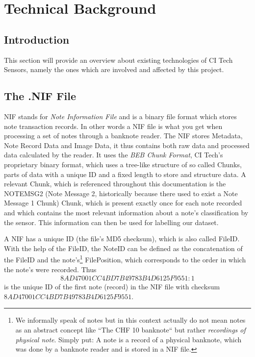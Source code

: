 \chapter{Technical Background}
\label{chap:technicalbackground}

\section{Introduction}
This section will provide an overview about existing technologies of CI Tech Sensors, namely the ones which are involved and affected by this project.

\section{The .NIF File}
NIF stands for \emph{Note Information File} and is a binary file format which stores note transaction records. In other words a NIF file is what you get when processing a set of notes through a banknote reader. The NIF stores Metadata, Note Record Data and Image Data, it thus contains both raw data and processed data calculated by the reader. It uses the \emph{BEB Chunk Format}, CI Tech's proprietary binary format, which uses a tree-like structure of so called Chunks, parts of data with a unique ID and a fixed length to store and structure data. A relevant Chunk, which is referenced throughout this documentation is the NOTEMSG2 (Note Message 2, historically because there used to exist a Note Message 1 Chunk) Chunk, which is present exactly once for each note recorded and which contains the most relevant information about a note's classification by the sensor. This information can then be used for labelling our dataset. \par
A NIF has a unique ID (the file's MD5 checksum), which is also called FileID. With the help of the FileID, the NoteID can be defined as the concatenation of the FileID and the note's\footnote{We informally speak of notes but in this context actually do not mean notes as an abstract concept like ``The CHF 10 banknote`` but rather \emph{recordings of physical note}. Simply put: A note is a record of a physical banknote, which was done by a banknote reader and is stored in a NIF file.} FilePosition, which corresponds to the order in which the note's were recorded. Thus
\begin{align*}
8AD47001CC4BD7B49783B4D6125F9551:1
\end{align*}
is the unique ID of the first note (record) in the NIF file with checksum $8AD47001CC4BD7B49783B4D6125F9551$.

